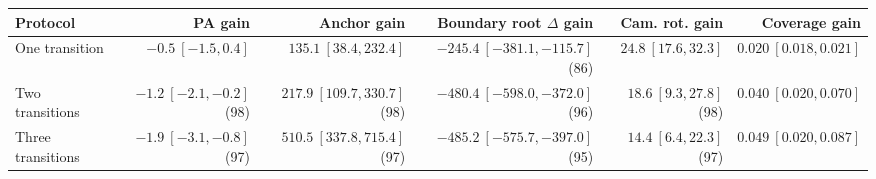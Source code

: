 \begin{tabular}{lrrrrr}
\toprule
Protocol & PA gain & Anchor gain & Boundary root $\Delta$ gain & Cam. rot. gain & Coverage gain \\
\midrule
One transition & $-0.5\ [-1.5,0.4]$ & $135.1\ [38.4,232.4]$ & $-245.4\ [-381.1,-115.7]$ (86) & $24.8\ [17.6,32.3]$ & $0.020\ [0.018,0.021]$ \\
Two transitions & $-1.2\ [-2.1,-0.2]$ (98) & $217.9\ [109.7,330.7]$ (98) & $-480.4\ [-598.0,-372.0]$ (96) & $18.6\ [9.3,27.8]$ (98) & $0.040\ [0.020,0.070]$ \\
Three transitions & $-1.9\ [-3.1,-0.8]$ (97) & $510.5\ [337.8,715.4]$ (97) & $-485.2\ [-575.7,-397.0]$ (95) & $14.4\ [6.4,22.3]$ (97) & $0.049\ [0.020,0.087]$ \\
\bottomrule
\end{tabular}
